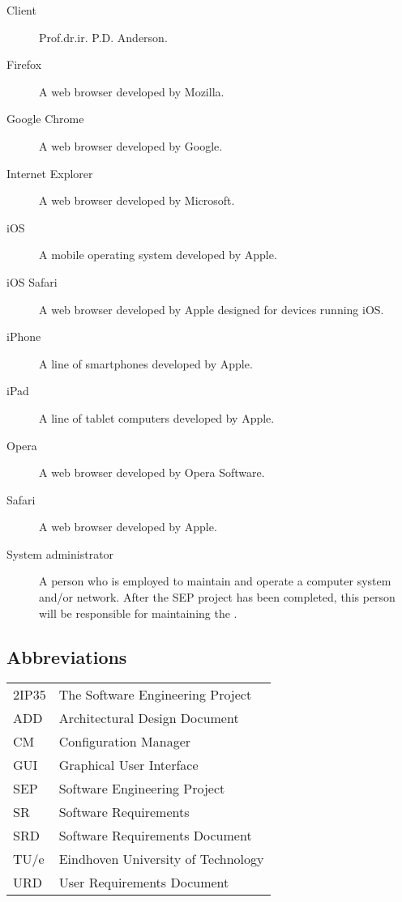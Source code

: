 \begin{description}
\item[Client] Prof.dr.ir. P.D. Anderson.
\item[Firefox] A web browser developed by Mozilla.
\item[Google Chrome] A web browser developed by Google.
\item[Internet Explorer] A web browser developed by Microsoft.
\item[iOS] A mobile operating system developed by Apple.
\item[iOS Safari] A web browser developed by Apple designed for devices running iOS.
\item[iPhone] A line of smartphones developed by Apple.
\item[iPad] A line of tablet computers developed by Apple.
\item[Opera] A web browser developed by Opera Software.
\item[Safari] A web browser developed by Apple.
\item[System administrator] A person who is employed to maintain and operate a computer system and/or network. After the SEP project has been completed, this person will be responsible for maintaining the \applicationname{}.
\end{description}

\subsection{Abbreviations}
\begin{tabular}{l|l}
2IP35 & The Software Engineering Project \\
ADD & Architectural Design Document \\
CM    & Configuration Manager \\
GUI & Graphical User Interface \\
SEP   & Software Engineering Project \\
SR    & Software Requirements \\
SRD   & Software Requirements Document \\
TU/e  & Eindhoven University of Technology \\
URD   & User Requirements Document \\
\end{tabular}

